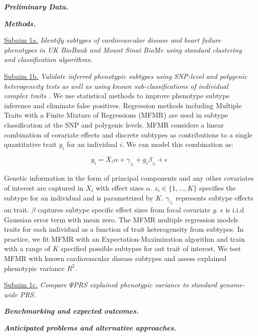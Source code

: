 \documentclass[11pt]{article}  %
\newlength\tindent
\renewcommand{\indent}{\hspace*{\tindent}}
\begin{document}
\indent \textbf{\textit{Preliminary Data.}}

\indent \textbf{\textit{Methods.}}

\indent \underline{Subaim 1a.} \textit{Identify subtypes of cardiovascular disease and heart failure phenotypes in UK BioBank and Mount Sinai BioMe using standard clustering and classification algorithms.}

\indent \underline{Subaim 1b.} \textit{Validate inferred phenotypic subtypes using SNP-level \cite{dahl_reverse_2019} and polygenic heterogeneity tests \cite{dahl_robust_2020} as well as using known sub-classifications of individual complex traits \cite{li_identification_2015} \cite{mordi_differential_2019}.} We use statistical methods to improve phenotype subtype inference and eliminate false positives. Regression methods including Multiple Traits with a Finite Mixture of Regressions (MFMR) \cite{dahl_reverse_2019} are used in subtype classification at the SNP and polygenic levels. MFMR considers a linear combination of covariate effects and discrete subtypes as contributions to a single quantitative trait $y_i$ for an individual $i$. We can model this combination as:

$$
y_i = X_i \alpha + \gamma_{z_i} + g_i \beta_{z_i} + \epsilon
$$

Genetic information in the form of principal components and any other covariates of interest are captured in $X_i$ with effect sizes $\alpha$. $z_i \in \{1,...,K\}$ specifies the subtype for an individual and is parametrized by $K$. $\gamma_{z_i}$ represents subtype effects on trait. $\beta$ captures subtype specific effect sizes from focal covariate $g$. $\epsilon$ is i.i.d Gaussian error term with mean zero. The MFMR multiple regression models traits for each individual as a function of trait heterogeneity from subtypes. In practice, we fit MFMR with an Expectation-Maximization algorithm and train with a range of $K$ specified possible subtypes for out trait of interest. We test MFMR with known cardiovascular disease subtypes \cite{mordi_differential_2019} and assess explained phenotypic variance $R^2$.  


\indent \underline{Subaim 1c.} \textit{Compare $\Psi$PRS explained phenotypic variance to standard genome-wide PRS.}

\indent \textbf{\textit{Benchmarking and expected outcomes.}}


\indent \textbf{\textit{Anticipated problems and alternative approaches.}}
\end{document}
